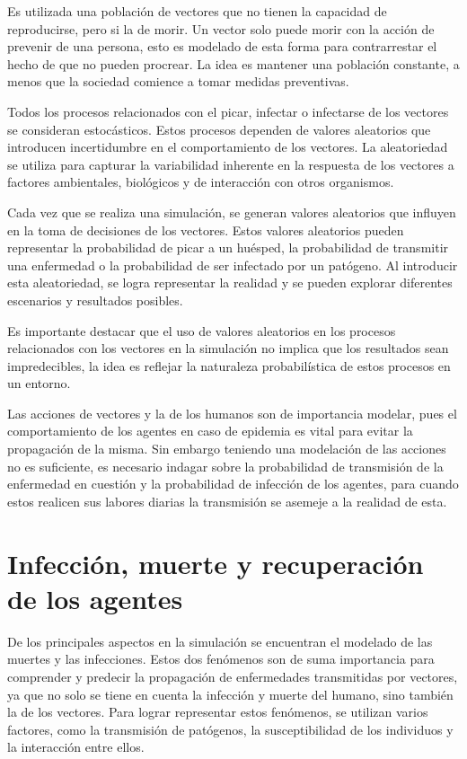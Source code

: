 Es utilizada una población de vectores que no tienen la capacidad de reproducirse, pero si la de morir. Un vector
solo puede morir con la acción de prevenir de una persona, esto es modelado de esta forma para contrarrestar
el hecho de que no pueden procrear. La idea es mantener una población constante, a menos que la sociedad
comience a tomar medidas preventivas.

Todos los procesos relacionados con el picar, infectar o infectarse de los vectores se consideran estocásticos. 
Estos procesos dependen de valores aleatorios que introducen incertidumbre en el 
comportamiento de los vectores. La aleatoriedad se utiliza para capturar la variabilidad inherente en 
la respuesta de los vectores a factores ambientales, biológicos y de interacción con otros organismos.

Cada vez que se realiza una simulación, se generan valores aleatorios que influyen en la toma de decisiones de 
los vectores. Estos valores aleatorios pueden representar la probabilidad de picar a un huésped, la 
probabilidad de transmitir una enfermedad o la probabilidad de ser infectado por un patógeno. Al introducir 
esta aleatoriedad, se logra representar la realidad y se pueden explorar diferentes escenarios 
y resultados posibles.

Es importante destacar que el uso de valores aleatorios en los procesos relacionados con los vectores en la 
simulación no implica que los resultados sean impredecibles, la idea es reflejar la 
naturaleza probabilística de estos procesos en un entorno.

Las acciones de vectores y la de los humanos son de importancia modelar, pues el comportamiento de los 
agentes en caso de epidemia es vital para evitar la propagación de la misma. Sin embargo teniendo una modelación
de las acciones no es suficiente, es necesario indagar sobre la probabilidad de transmisión de la enfermedad en 
cuestión y la probabilidad de infección de los agentes, para cuando estos realicen sus labores diarias
la transmisión se asemeje a la realidad de esta.

\section{Infección, muerte y recuperación de los agentes}
De los principales aspectos en la simulación se encuentran el modelado de las muertes y las infecciones.
Estos dos fenómenos son de suma importancia para comprender y predecir la propagación de enfermedades 
transmitidas por vectores, ya que no solo se tiene en cuenta la infección y muerte del humano, sino también
la de los vectores. Para lograr representar estos fenómenos, se utilizan varios
factores, como la transmisión de patógenos, la susceptibilidad de los individuos y la interacción entre ellos.

